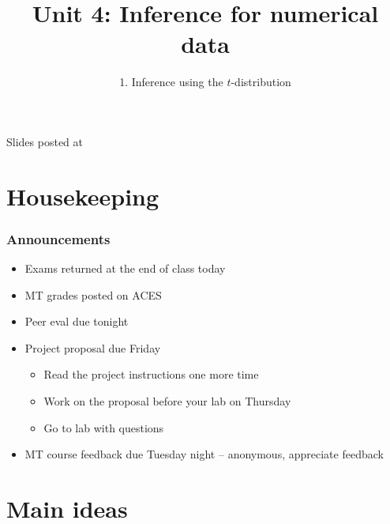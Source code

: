 \documentclass[slidestop,compress,mathserif,12pt,t,professionalfonts,xcolor=table]{beamer}
\title{Unit 4: Inference for numerical data}
\subtitle{1. Inference using the $t$-distribution}
\author{\CourseName}
\date{}
\institute{\InstituteName}
\begin{document}



\begin{frame}[plain]

\titlepage

\vfill

{\scriptsize {} \hfill Slides posted at  \webURL{\CourseSite}}

\addtocounter{framenumber}{-1} 

\end{frame}


\section{Housekeeping}


\begin{frame}
\frametitle{Announcements}

\begin{itemize}

\item Exams returned at the end of class today

\item MT grades posted on ACES

\item Peer eval due tonight

\item Project proposal due Friday
\begin{itemize}
\item Read the project instructions one more time
\item Work on the proposal before your lab on Thursday
\item Go to lab with questions
\end{itemize}

\item MT course feedback due Tuesday night -- anonymous, appreciate feedback

\end{itemize}

\end{frame}


\section{Main ideas}
\end{document}

